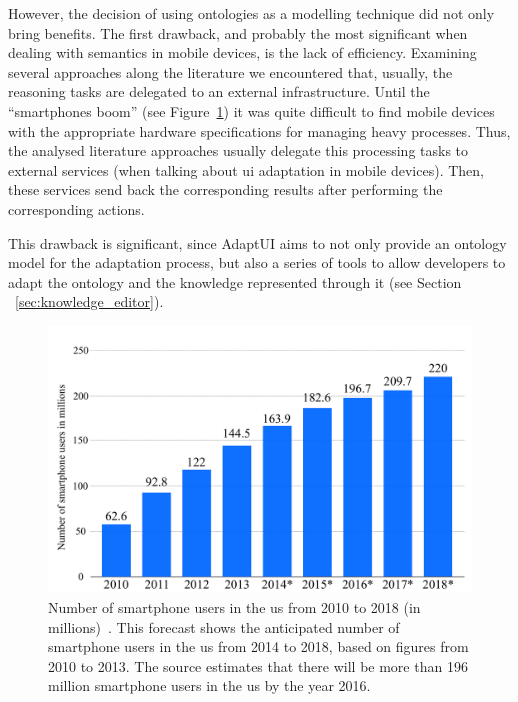 However, the decision of using ontologies as a modelling technique did not only
bring benefits. The first drawback, and probably the most significant when dealing
with semantics in mobile devices, is the lack of efficiency. Examining several
approaches along the literature we encountered that, usually, the reasoning tasks
are delegated to an external infrastructure. Until the ``smartphones boom'' (see
Figure~\ref{fig:smartphones_boom}) it was quite difficult to find mobile devices
with the appropriate hardware specifications for managing heavy processes. Thus,
the analysed literature approaches usually delegate this processing tasks to
external services (when talking about \acs{ui} adaptation in mobile devices). Then,
these services send back the corresponding results after performing the
corresponding actions. 

This drawback is significant, since AdaptUI aims to not only provide an ontology
model for the adaptation process, but also a series of tools to allow developers
to adapt the ontology and the knowledge represented through it (see Section
~\ref{sec:knowledge_editor}).


\begin{figure}[H]
\centering
\includegraphics[width=1.0\textwidth]{../figures/PDF/smartphones_boom.pdf}
\caption{Number of smartphone users in the \ac{us} from 2010 to 2018 (in
millions)~\citep{smartphones_boom}. This forecast shows the anticipated number
of smartphone users in the \ac{us} from 2014 to 2018, based on figures from 2010 
to 2013. The source estimates that there will be more than 196 million smartphone
users in the \ac{us} by the year 2016.}
\label{fig:smartphones_boom}
\end{figure}

